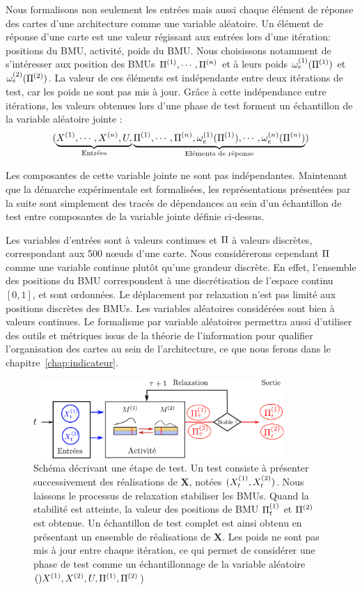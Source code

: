 \documentclass[../main]{subfiles}
\begin{document}
Nous formalisons non seulement les entrées mais aussi chaque élément de réponse des cartes d'une architecture comme une variable aléatoire.
Un élément de réponse d'une carte est une valeur régissant aux entrées lors d'une itération: positions du BMU, activité, poids du BMU.
Nous choisissons notamment de s'intéresser aux position des BMUs $\Pi^{({1})}, \cdots, \Pi^{({n})}$ et à leurs poids $\omega_{e}^{({1})}(\Pi^{({1})})$ et $\omega_{e}^{({2})}(\Pi^{({2})})$.
La valeur de ces éléments est indépendante entre deux itérations de test, car les poids ne sont pas mis à jour.
Grâce à cette indépendance entre itérations, les valeurs obtenues lors d'une phase de test forment un échantillon de la variable aléatoire jointe : 
$$(\underbrace{X^{({1})}, \cdots, X^{({n})}, U,}_{\text{Entrées}} \underbrace{\Pi^{({1})}, \cdots, \Pi^{({n})}, \omega_e^{({1})}(\Pi^{({1})}), \cdots, \omega_e^{({n})}(\Pi^{({n})})}_{\text{Eléments de réponse}})$$

Les composantes de cette variable jointe ne sont pas indépendantes. Maintenant que la démarche expérimentale est formalisées, les représentations présentées par la suite sont simplement des tracés de dépendances au sein d'un échantillon de test entre composantes de la variable jointe définie ci-dessus.

Les variables d'entrées sont à valeurs continues et $\Pi$ à valeurs discrètes, correspondant aux 500 n\oe{}uds d'une carte. Nous considérerons cependant $\Pi$ comme une variable continue plutôt qu'une grandeur discrète. En effet, l'ensemble des positions du BMU correspondent à une discrétisation de l'espace continu $[0,1]$, et sont ordonnées. Le déplacement par relaxation n'est pas limité aux positions discrètes des BMUs. Les variables aléatoires considérées sont bien à valeurs continues. Le formalisme par variable aléatoires permettra aussi d'utiliser des outils et métriques issus de la théorie de l'information pour qualifier l'organisation des cartes au sein de l'architecture, ce que nous ferons dans le chapitre~\ref{chap:indicateur}.

\begin{figure}
\centering
\includegraphics[width=0.85\textwidth]{tests_2maps.pdf}
\caption{Schéma décrivant une étape de test. Un test consiste à présenter successivement des réalisations de $\mathbf{X}$, notées $(X^{({1})}_t,X^{({2})}_t)$. Nous laissons le processus de relaxation stabiliser les BMUs. Quand la stabilité est atteinte, la valeur des positions de BMU $\Pi^{({1})}_t$ et $\Pi^{({2})}$ est obtenue. Un échantillon de test complet est ainsi obtenu en présentant un ensemble de réalisations de $\mathbf{X}$. Les poids ne sont pas mis à jour entre chaque itération, ce qui permet de considérer une phase de test comme un échantillonnage de la variable aléatoire $()X^{({1})},X^{({2})}, U, \Pi^{({1})}, \Pi^{({2})}$) }
\label{fig:flowchart}
\end{figure}
\end{document}
